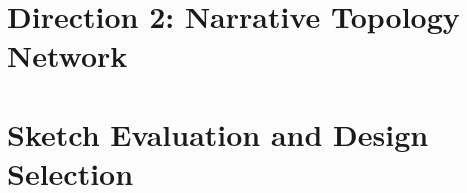 \documentclass[logo,msc]{infthesis}
\begin{document}
\section{Direction 2: Narrative Topology Network}
%
%
%
%
%
%

\section{Sketch Evaluation and Design Selection}
%
\end{document}

